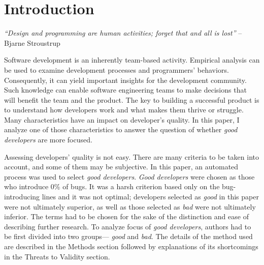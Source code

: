 
\chapter{Introduction}\label{chapter:introduction}
\textit{“Design and programming are human activities; forget that and all is lost”} – Bjarne Stroustrup

\vspace{5mm}

Software development is an inherently team-based activity. Empirical analysis can be used to examine development processes and programmers’ behaviors. Consequently, it can yield important insights for the development community. Such knowledge can enable software engineering teams to make decisions that will benefit the team and the product. The key to building a successful product is to understand how developers work and what makes them thrive or struggle. Many characteristics have an impact on developer’s quality. In this paper, I analyze one of those characteristics to answer the question of whether \textit{good developers} are more focused. 
\par
Assessing developers’ quality is not easy. There are many criteria to be taken into account, and some of them may be subjective. In this paper, an automated process was used to select \textit{good developers}. \textit{Good developers} were chosen as those who introduce 0\% of bugs. It was a harsh criterion based only on the bug-introducing lines and it was not optimal; developers selected as \textit{good} in this paper were not ultimately superior, as well as those selected as \textit{bad} were not ultimately inferior. The terms had to be chosen for the sake of the distinction and ease of describing further research. To analyze focus of \textit{good developers}, authors had to be first divided into two groups— \textit{good} and \textit{bad}. The details of the method used are described in the Methods section followed by explanations of its shortcomings in the Threats to Validity section.

